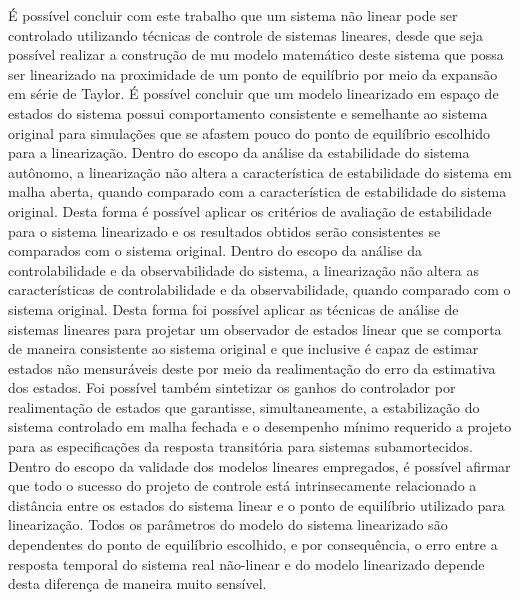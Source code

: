 \documentclass[a4paper]{ifacconf}
\begin{document}
    É possível concluir com este trabalho que um sistema não linear pode ser controlado utilizando técnicas de controle de sistemas lineares, desde que seja possível realizar a construção de mu modelo matemático deste sistema que possa ser linearizado na proximidade de um ponto de equilíbrio por meio da expansão em série de Taylor. É possível concluir que um modelo linearizado em espaço de estados do sistema possui comportamento consistente e semelhante ao sistema original para simulações que se afastem pouco do ponto de equilíbrio escolhido para a linearização. 
    Dentro do escopo da análise da estabilidade do sistema autônomo, a linearização não altera a característica de estabilidade do sistema em malha aberta, quando comparado com a característica de estabilidade do sistema original. Desta forma é possível aplicar os critérios de avaliação de estabilidade para o sistema linearizado e os resultados obtidos serão consistentes se comparados com o sistema original. 
    Dentro do escopo da análise da controlabilidade e da observabilidade do sistema, a linearização não altera as características de controlabilidade e da observabilidade, quando comparado com o sistema original. Desta forma foi possível aplicar as técnicas de análise de sistemas lineares para projetar um observador de estados linear que se comporta de maneira consistente ao sistema original e que inclusive é capaz de estimar estados não mensuráveis deste por meio da realimentação do erro da estimativa dos estados. Foi possível também sintetizar os ganhos do controlador por realimentação de estados que garantisse, simultaneamente, a estabilização do sistema controlado em malha fechada e o desempenho mínimo requerido a projeto para as especificações da resposta transitória para sistemas subamortecidos.
    Dentro do escopo da validade dos modelos lineares empregados, é possível afirmar que todo o sucesso do projeto de controle está intrinsecamente relacionado a distância entre os estados do sistema linear e o ponto de equilíbrio utilizado para linearização. Todos os parâmetros do modelo do sistema linearizado são dependentes do ponto de equilíbrio escolhido, e por consequência, o erro entre a resposta temporal do sistema real não-linear e do modelo linearizado depende desta diferença de maneira muito sensível.
    
    
\end{document}
